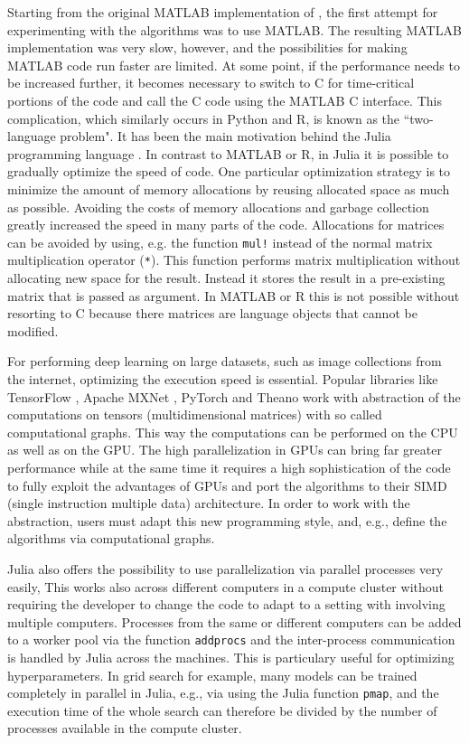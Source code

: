 \documentclass[12pt]{article}
\newcommand{\inlinecode}[1]{\texttt{#1}}
\begin{document}
Starting from the original MATLAB implementation of \cite{hinton_reducing_2006}, the first attempt for experimenting with the algorithms was to use MATLAB.
The resulting MATLAB implementation was very slow, however, and the possibilities for making MATLAB code run faster are limited.
At some point, if the performance needs to be increased further,  it becomes necessary to switch to C for time-critical portions of the code and call the C code using the MATLAB C interface.
This complication, which similarly occurs in Python and R, is known as the ``two-language problem". 
It has been the main motivation behind the Julia programming language \citep{bezanson2017julia}.
In contrast to MATLAB or R, in Julia it is possible to gradually optimize the speed of code.
One particular optimization strategy is to minimize the amount of memory allocations by reusing allocated space as much as possible.
Avoiding the costs of memory allocations and garbage collection greatly increased the speed in many parts of the code.
Allocations for matrices can be avoided by using, e.g. the function \inlinecode{mul!} instead of the normal matrix multiplication operator (\inlinecode{*}).
This function performs matrix multiplication without allocating new space for the result.
Instead it stores the result in a pre-existing matrix that is passed as argument.
In MATLAB or R this is not possible without resorting to C because there matrices are language objects that cannot be modified.

For performing deep learning on large datasets, such as image collections from the internet, optimizing the execution speed is essential.
Popular libraries like TensorFlow \citep{abadi2016tensorflow}, Apache MXNet \citep{mxnet}, PyTorch \citep{pytorch} and Theano \citep{theano}
work with abstraction of the computations on tensors (multidimensional matrices) with so called computational graphs.
This way the computations can be performed on the CPU as well as on the GPU.
The high parallelization in GPUs can bring far greater performance while at the same time it requires a high sophistication of the code to fully exploit the advantages of GPUs and port the algorithms to their SIMD (single instruction multiple data) architecture.
In order to work with the abstraction, users must adapt this new programming style, and, e.g., define the algorithms via computational graphs.

Julia also offers the possibility to use parallelization via parallel processes very easily, This works also across different computers in a compute cluster without requiring the developer to change the code to adapt to a setting with involving multiple computers.
Processes from the same or different computers can be added to a worker pool via the function \inlinecode{addprocs} and the inter-process communication is handled by Julia across the machines.
This is particulary useful for optimizing hyperparameters.
In grid search \citep{bergstra_algorithms_2011} for example, many models can be trained completely in parallel in Julia, e.g., via using the Julia function  \inlinecode{pmap}, and the execution time of the whole search can therefore be divided by the number of processes available in the compute cluster.
\end{document}
